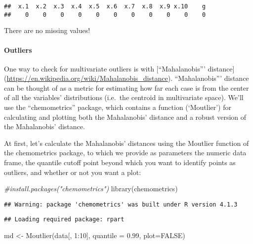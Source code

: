 \documentclass[
]{article}
\newenvironment{Shaded}{\begin{snugshade}}{\end{snugshade}}
\newcommand{\AttributeTok}[1]{\textcolor[rgb]{0.77,0.63,0.00}{#1}}
\newcommand{\CommentTok}[1]{\textcolor[rgb]{0.56,0.35,0.01}{\textit{#1}}}
\newcommand{\ConstantTok}[1]{\textcolor[rgb]{0.00,0.00,0.00}{#1}}
\newcommand{\DecValTok}[1]{\textcolor[rgb]{0.00,0.00,0.81}{#1}}
\newcommand{\FloatTok}[1]{\textcolor[rgb]{0.00,0.00,0.81}{#1}}
\newcommand{\FunctionTok}[1]{\textcolor[rgb]{0.00,0.00,0.00}{#1}}
\newcommand{\NormalTok}[1]{#1}
\newcommand{\OtherTok}[1]{\textcolor[rgb]{0.56,0.35,0.01}{#1}}
\newcommand{\SpecialCharTok}[1]{\textcolor[rgb]{0.00,0.00,0.00}{#1}}
\begin{document}
\begin{verbatim}
##  x.1  x.2  x.3  x.4  x.5  x.6  x.7  x.8  x.9 x.10    g 
##    0    0    0    0    0    0    0    0    0    0    0
\end{verbatim}

There are no missing values!

\hypertarget{outliers}{%
\paragraph{Outliers}\label{outliers}}

One way to check for multivariate outliers is with {[}``Mahalanobis'''
distance{]} (\url{https://en.wikipedia.org/wiki/Mahalanobis_distance}).
``Mahalanobis''' distance can be thought of as a metric for estimating
how far each case is from the center of all the variables' distributions
(i.e.~the centroid in multivariate space). We'll use the
``chemometrics'' package, which contains a function (`Moutlier') for
calculating and plotting both the Mahalanobis' distance and a robust
version of the Mahalanobis' distance.

At first, let's calculate the Mahalanobis' distances using the Moutlier
function of the chemometrics package, to which we provide as parameters
the numeric data frame, the quantile cutoff point beyond which you want
to identify points as outliers, and whether or not you want a plot:

\begin{Shaded}
\begin{Highlighting}[]
\CommentTok{\#install.packages("chemometrics")}
\FunctionTok{library}\NormalTok{(chemometrics)}
\end{Highlighting}
\end{Shaded}

\begin{verbatim}
## Warning: package 'chemometrics' was built under R version 4.1.3
\end{verbatim}

\begin{verbatim}
## Loading required package: rpart
\end{verbatim}

\begin{Shaded}
\begin{Highlighting}[]
\NormalTok{md }\OtherTok{\textless{}{-}} \FunctionTok{Moutlier}\NormalTok{(data[, }\DecValTok{1}\SpecialCharTok{:}\DecValTok{10}\NormalTok{], }\AttributeTok{quantile =} \FloatTok{0.99}\NormalTok{, }\AttributeTok{plot=}\ConstantTok{FALSE}\NormalTok{)}
\end{Highlighting}
\end{Shaded}
\end{document}

